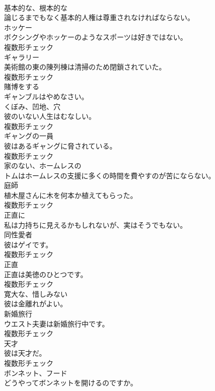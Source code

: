 \documentclass[8pt]{extreport}
\begin{document}
\begin{CJK}{UTF8}{min}
\\	[形容詞]	基本的な、根本的な	
\\	論じるまでもなく基本的人権は尊重されなければならない。	
\\	[名詞]	ホッケー	
\\	ボクシングやホッケーのようなスポーツは好きではない。	
\\	複数形チェック
\\	[名詞]	ギャラリー	
\\	美術館の東の陳列棟は清掃のため閉鎖されていた。	
\\	複数形チェック
\\	[動詞]	賭博をする	
\\	ギャンブルはやめなさい。	
\\	[名詞]	くぼみ、凹地、穴	
\\	彼のいない人生はむなしい。	
\\	複数形チェック
\\	[名詞]	ギャングの一員	
\\	彼はあるギャングに脅されている。	
\\	複数形チェック
\\	[形容詞]	家のない、ホームレスの	
\\	トムはホームレスの支援に多くの時間を費やすのが苦にならない。	
\\	[名詞]	庭師	
\\	植木屋さんに木を何本か植えてもらった。	
\\	複数形チェック
\\	[副詞]	正直に	
\\	私は力持ちに見えるかもしれないが、実はそうでもない。	
\\	[名詞]	同性愛者	
\\	彼はゲイです。	
\\	複数形チェック
\\	[名詞]	正直	
\\	正直は美徳のひとつです。	
\\	複数形チェック
\\	[形容詞]	寛大な、惜しみない	
\\	彼は金離れがよい。	
\\	[名詞]	新婚旅行	
\\	ウエスト夫妻は新婚旅行中です。	
\\	複数形チェック
\\	[名詞]	天才	
\\	彼は天才だ。	
\\	複数形チェック
\\	[名詞]	ボンネット、フード	
\\	どうやってボンネットを開けるのですか。	

\end{CJK}
\end{document}
